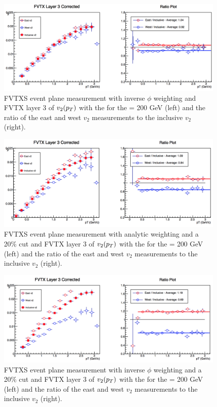 \begin{figure}
\includegraphics[width=0.65\linewidth]{figs/fvtx_3_data.png}
\caption{FVTXS event plane measurement with inverse $\phi$ weighting and FVTX layer 3 of $v_{2}(\mbox{$p_T$})$ with the  for the \pau \sqsn = 200 GeV (left) and the ratio of the east and west $v_2$ measurements to the inclusive $v_2$ (right).}
\end{figure}

\begin{figure}
\includegraphics[width=0.65\linewidth]{figs/fvtx_3_analytic.png}
\caption{FVTXS event plane measurement with analytic weighting and a 20\% cut and FVTX layer 3 of $v_{2}(\mbox{$p_T$})$ with the  for the \pau \sqsn = 200 GeV (left) and the ratio of the east and west $v_2$ measurements to the inclusive $v_2$ (right).}
\end{figure}
\clearpage
\begin{figure}

\includegraphics[width=0.65\linewidth]{figs/fvtx_3_data_cut.png}
\caption{FVTXS event plane measurement with inverse $\phi$ weighting and a 20\% cut and FVTX layer 3 of $v_{2}(\mbox{$p_T$})$ with the  for the \pau \sqsn = 200 GeV (left) and the ratio of the east and west $v_2$ measurements to the inclusive $v_2$ (right).}
\end{figure}

